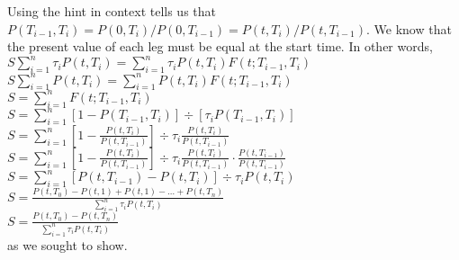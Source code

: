 \documentclass{article}
\begin{document}
{Using the hint in context tells us that $P(T_{i-1}, T_i) = P(0, T_i) / P(0, T_{i-1}) = P(t, T_i) / P(t, T_{i-1})$. We know that the present value of each leg must be equal at the start time. In other words, \\
$S\sum_{i=1}^{n} \tau_i P(t, T_i) = \sum_{i=1}^{n} \tau_i P(t, T_i)F(t; T_{i-1}, T_i)$ \\ 
$S\sum_{i=1}^{n} P(t, T_i) = \sum_{i=1}^{n} P(t, T_i)F(t; T_{i-1}, T_i)$ \\ 
$S = \sum_{i=1}^{n} F(t; T_{i-1}, T_i)$ \\ 
$S = \sum_{i=1}^{n} [1 - P(T_{i-1}, T_i)] \div [\tau_iP(T_{i-1}, T_i)]$ \\ 
$S = \sum_{i=1}^{n} [1 - \frac{P(t, T_i)}{P(t, T_{i-1})}] \div \tau_i \frac{P(t, T_i)}{P(t, T_{i-1})}$ \\ 
$S = \sum_{i=1}^{n} [1 - \frac{P(t, T_i)}{P(t, T_{i-1})}] \div \tau_i \frac{P(t, T_i)}{P(t, T_{i-1})} \cdot \frac{P(t, T_{i-1})}{P(t, T_{i-1})}$ \\ 
$S = \sum_{i=1}^{n} [P(t, T_{i-1}) - P(t, T_i)] \div \tau_i P(t, T_i)  $ \\ 
$S = \frac{P(t, T_0) - P(t, 1) + P(t, 1) - \dots + P(t, T_n)}{\sum_{i=1}^{n} \tau_i P(t, T_i)}  $ \\ 
$S = \frac{P(t, T_0) - P(t, T_n)}{\sum_{i=1}^{n} \tau_i P(t, T_i)} $ \\
as we sought to show.

}
\end{document}
